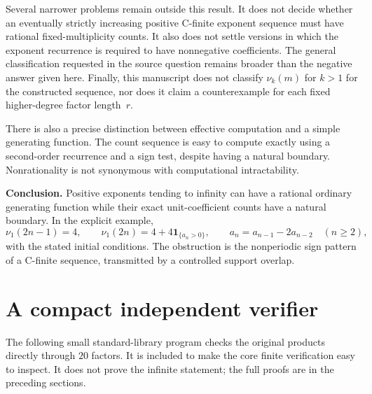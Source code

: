 \documentclass[11pt]{article}
\theoremstyle{definition}\newtheorem{definition}[theorem]{Definition}
\theoremstyle{remark}\newtheorem{remark}[theorem]{Remark}
\newcommand{\ind}{\mathbf 1}
\newcommand{\nuone}{\nu_1}
\begin{document}
Several narrower problems remain outside this result. It does not decide whether an eventually strictly increasing positive C-finite exponent sequence must have rational fixed-multiplicity counts. It also does not settle versions in which the exponent recurrence is required to have nonnegative coefficients. The general classification requested in the source question remains broader than the negative answer given here. Finally, this manuscript does not classify $\nu_k(m)$ for $k>1$ for the constructed sequence, nor does it claim a counterexample for each fixed higher-degree factor length~$r$.

There is also a precise distinction between effective computation and a simple generating function. The count sequence is easy to compute exactly using a second-order recurrence and a sign test, despite having a natural boundary. Nonrationality is not synonymous with computational intractability.

\begin{resultbox}[breakable=false]
\textbf{Conclusion.} Positive exponents tending to infinity can have a rational ordinary generating function while their exact unit-coefficient counts have a natural boundary. In the explicit example,
\[
 \nuone(2n-1)=4,\qquad
 \nuone(2n)=4+4\ind_{\{a_n>0\}},\qquad
 a_n=a_{n-1}-2a_{n-2}\quad(n\geq2),
\]
with the stated initial conditions. The obstruction is the nonperiodic sign pattern of a C-finite sequence, transmitted by a controlled support overlap.
\end{resultbox}

\appendix
\section{A compact independent verifier}

The following small standard-library program checks the original products directly through $20$ factors. It is included to make the core finite verification easy to inspect. It does not prove the infinite statement; the full proofs are in the preceding sections.
\end{document}
